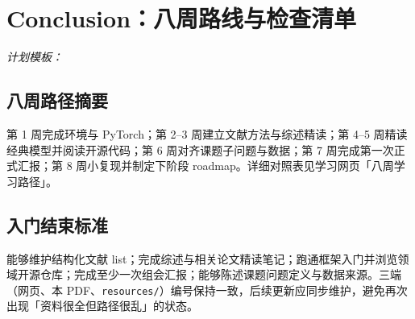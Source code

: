 ﻿\section{Conclusion：八周路线与检查清单}
\label{sec:concl}

\noindent\small\textit{计划模板：}\par\normalsize\vspace{6pt}

\subsection{八周路径摘要}
第 1 周完成环境与 PyTorch；第 2--3 周建立文献方法与综述精读；第 4--5 周精读经典模型并阅读开源代码；第 6 周对齐课题子问题与数据；第 7 周完成第一次正式汇报；第 8 周小复现并制定下阶段 roadmap。详细对照表见学习网页「八周学习路径」。

\subsection{入门结束标准}
能够维护结构化文献 list；完成综述与相关论文精读笔记；跑通框架入门并浏览领域开源仓库；完成至少一次组会汇报；能够陈述课题问题定义与数据来源。三端（网页、本 PDF、\texttt{resources/}）编号保持一致，后续更新应同步维护，避免再次出现「资料很全但路径很乱」的状态。

